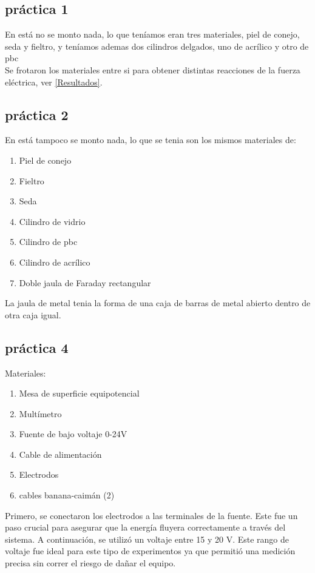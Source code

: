 \documentclass{article}
\begin{document}
\begin{multicols}{2}
\subsection{práctica 1}\label{dep1}
En está no se monto nada, lo que teníamos eran tres materiales, piel de conejo,\\
seda y fieltro, y teníamos ademas dos cilindros delgados, uno de acrílico y otro de pbc\\

Se frotaron los materiales entre si para obtener distintas reacciones de la fuerza eléctrica, ver \ref{Resultados}.
\subsection{práctica 2}\label{dep2}
En está tampoco se monto nada, lo que se tenia son los mismos materiales de:
\begin{enumerate}
	\item Piel de conejo
	\item Fieltro
	\item Seda
	\item Cilindro de vidrio
	\item Cilindro de pbc
	\item Cilindro de acrílico
	\item Doble jaula de Faraday rectangular
\end{enumerate}

La jaula de metal tenia la forma de una caja de barras de metal abierto dentro de otra caja igual.
\subsection{práctica 4}\label{dep4}
Materiales:
\begin{enumerate}
	\item Mesa de superficie equipotencial
	\item Multímetro
	\item Fuente de bajo voltaje 0-24V
	\item Cable de alimentación
	\item Electrodos
	\item cables banana-caimán (2)
\end{enumerate}

Primero, se conectaron los electrodos a las terminales de la fuente. Este fue un paso crucial para asegurar que la energía fluyera correctamente a través del sistema. A continuación, se utilizó un voltaje entre 15 y 20 V. Este rango de voltaje fue ideal para este tipo de experimentos ya que permitió una medición precisa sin correr el riesgo de dañar el equipo.


\end{multicols}
\end{document}
